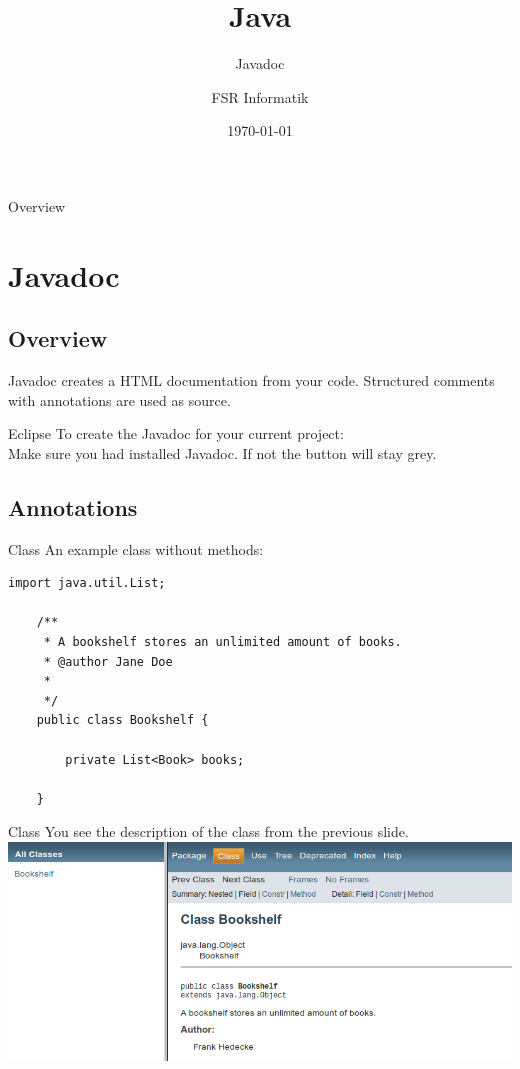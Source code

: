 

\title{Java}
\subtitle{Javadoc}
\author{FSR Informatik}
\date{\today}



\begin{frame}
\titlepage
\end{frame}
\begin{frame}{Overview}
\tableofcontents
\end{frame}

\section{Javadoc}
\subsection{Overview}
\begin{frame}{}
	Javadoc creates a HTML documentation from your code.
	\vfill
	Structured comments with annotations are used as source.
\end{frame}

\begin{frame}{Eclipse}
	To create the Javadoc for your current project: \\
	\vfill
	Make sure you had installed Javadoc. 
	If not the  button will stay grey.
\end{frame}

\subsection{Annotations}
\begin{frame}[fragile]{Class}
	An example class without methods:
	\begin{lstlisting}[basicstyle=\ttfamily\scriptsize, escapechar=!,
	commentstyle=\color{lightblue}]
    import java.util.List;

    /**
     * A bookshelf stores an unlimited amount of books.
     * @author Jane Doe
     *
     */
    public class Bookshelf {
    
	    private List<Book> books;

    }
	\end{lstlisting}
\end{frame}

\begin{frame}{Class}
	You see the description of the class from the previous slide.
	\vfill
	\includegraphics[scale=0.3]{res/javadoc_class.png}
\end{frame}

